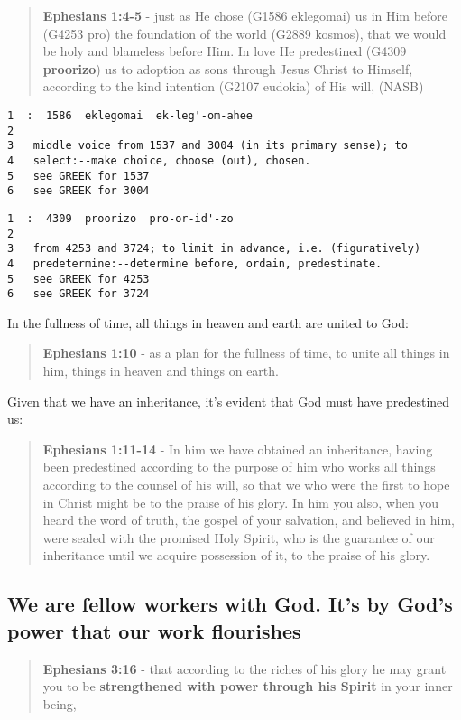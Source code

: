 \documentclass[11pt]{article}
\begin{document}
\begin{quote}
\textbf{Ephesians 1:4-5} - just as He chose (G1586 eklegomai) us in Him before (G4253 pro) the foundation of the world (G2889 kosmos), that we would be holy and blameless before Him. In love He predestined (G4309 \textbf{proorizo}) us to adoption as sons through Jesus Christ to Himself, according to the kind intention (G2107 eudokia) of His will, (NASB)
\end{quote}

\begin{verbatim}
1  :  1586  eklegomai  ek-leg'-om-ahee
2  
3   middle voice from 1537 and 3004 (in its primary sense); to
4   select:--make choice, choose (out), chosen.
5   see GREEK for 1537
6   see GREEK for 3004
\end{verbatim}

\begin{verbatim}
1  :  4309  proorizo  pro-or-id'-zo
2  
3   from 4253 and 3724; to limit in advance, i.e. (figuratively)
4   predetermine:--determine before, ordain, predestinate.
5   see GREEK for 4253
6   see GREEK for 3724
\end{verbatim}

In the fullness of time, all things in heaven and earth are united to God:

\begin{quote}
\textbf{Ephesians 1:10} - as a plan for the fullness of time, to unite all things in him, things in heaven and things on earth.
\end{quote}

Given that we have an inheritance, it's evident that God must have predestined us:

\begin{quote}
\textbf{Ephesians 1:11-14} - In him we have obtained an inheritance, having been predestined according to the purpose of him who works all things according to the counsel of his will, so that we who were the first to hope in Christ might be to the praise of his glory. In him you also, when you heard the word of truth, the gospel of your salvation, and believed in him, were sealed with the promised Holy Spirit, who is the guarantee of our inheritance until we acquire possession of it, to the praise of his glory.
\end{quote}

\subsection{We are fellow workers with God. It's by God's power that our work flourishes}
\label{sec:orgeed20a0}
\begin{quote}
\textbf{Ephesians 3:16} - that according to the riches of his glory he may grant you to be \textbf{strengthened with power through his Spirit} in your inner being,
\end{quote}
\end{document}

